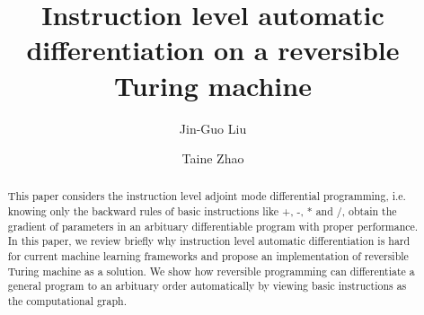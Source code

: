 \documentclass[aps,twocolumn,longbibliography,english,superscriptaddress,prr]{revtex4-1}
\newcommand{\<}{\langle}
\renewcommand{\>}{\rangle}
\theoremstyle{definition}\newtheorem{definition}{\textit{Definition}}
\begin{document}
\title{Instruction level automatic differentiation on a reversible Turing machine}


\author{Jin-Guo Liu}

\author{Taine Zhao}

\begin{abstract}
    This paper considers the instruction level adjoint mode differential programming, i.e. knowing only the backward rules of basic instructions like +, -, * and /, obtain the gradient of parameters in an arbituary differentiable program with proper performance. In this paper, we review briefly why instruction level automatic differentiation is hard for current machine learning frameworks and propose an implementation of reversible Turing machine as a solution. We show how reversible programming can differentiate a general program to an arbituary order automatically by viewing basic instructions as the computational graph.
\end{abstract}


\maketitle

\end{document}
